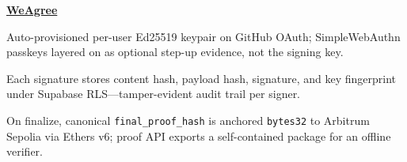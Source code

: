 \begin{twocolentry}{}
\href{https://github.com/faketut/WeAgree}{\textbf{WeAgree}}
\end{twocolentry}
\begin{onecolentry}
\begin{highlights}
\item Auto-provisioned per-user Ed25519 keypair on GitHub OAuth; SimpleWebAuthn passkeys layered on as optional step-up evidence, not the signing key.
\item Each signature stores content hash, payload hash, signature, and key fingerprint under Supabase RLS---tamper-evident audit trail per signer.
\item On finalize, canonical \texttt{final\_proof\_hash} is anchored \texttt{bytes32} to Arbitrum Sepolia via Ethers v6; proof API exports a self-contained package for an offline verifier.
\end{highlights}
\end{onecolentry}

